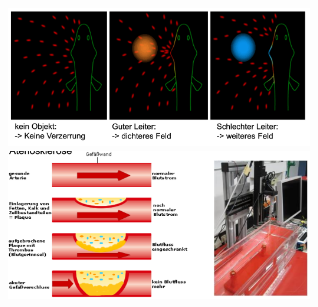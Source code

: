 \begin{center}
    \includegraphics[width=8cm]{lec8/figures/leiter.png}
    \hfill
    \includegraphics[width=8cm]{lec8/figures/plaques.png}
\end{center}